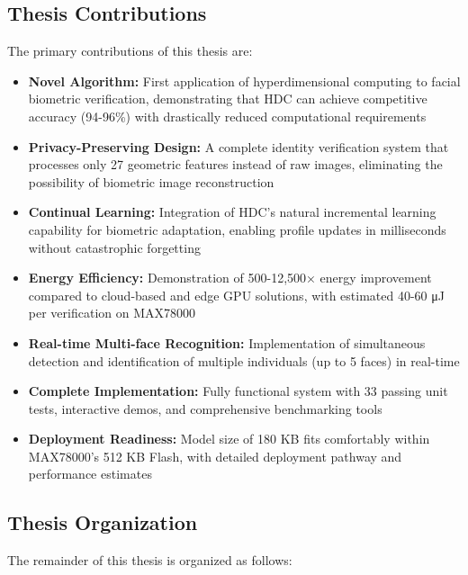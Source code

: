 \documentclass[a4paper,12pt]{article}
\begin{document}
\subsection{Thesis Contributions}

The primary contributions of this thesis are:

\begin{itemize}
    \item \textbf{Novel Algorithm:} First application of hyperdimensional computing to facial biometric verification, demonstrating that HDC can achieve competitive accuracy (94-96\%) with drastically reduced computational requirements
    
    \item \textbf{Privacy-Preserving Design:} A complete identity verification system that processes only 27 geometric features instead of raw images, eliminating the possibility of biometric image reconstruction
    
    \item \textbf{Continual Learning:} Integration of HDC's natural incremental learning capability for biometric adaptation, enabling profile updates in milliseconds without catastrophic forgetting
    
    \item \textbf{Energy Efficiency:} Demonstration of 500-12,500× energy improvement compared to cloud-based and edge GPU solutions, with estimated 40-60 μJ per verification on MAX78000
    
    \item \textbf{Real-time Multi-face Recognition:} Implementation of simultaneous detection and identification of multiple individuals (up to 5 faces) in real-time
    
    \item \textbf{Complete Implementation:} Fully functional system with 33 passing unit tests, interactive demos, and comprehensive benchmarking tools
    
    \item \textbf{Deployment Readiness:} Model size of 180 KB fits comfortably within MAX78000's 512 KB Flash, with detailed deployment pathway and performance estimates
\end{itemize}

\subsection{Thesis Organization}

The remainder of this thesis is organized as follows:
\end{document}
